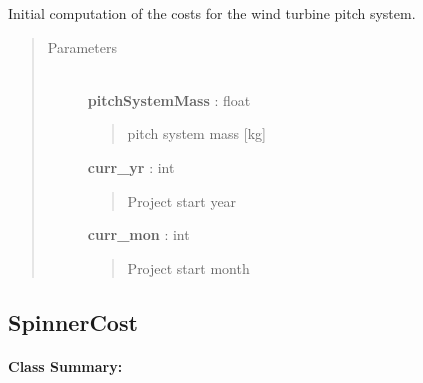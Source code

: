 \documentclass[letterpaper,10pt,openany,oneside]{sphinxmanual}
\begin{document}
\begin{fulllineitems}
\label{documentation:turbine_costSE.src.rotor_costsSE.PitchCost}
Initial computation of the costs for the wind turbine pitch system.
\begin{quote}\begin{description}
\item[{Parameters }] \leavevmode\\
\textbf{pitchSystemMass} : float
\begin{quote}

pitch system mass {[}kg{]}
\end{quote}

\textbf{curr\_yr} : int
\begin{quote}

Project start year
\end{quote}

\textbf{curr\_mon} : int
\begin{quote}

Project start month
\end{quote}

\end{description}\end{quote}

\end{fulllineitems}



\subsection{SpinnerCost}
\label{documentation:spinnercost-class-label}\label{documentation:spinnercost}\paragraph{Class Summary:}
\end{document}
